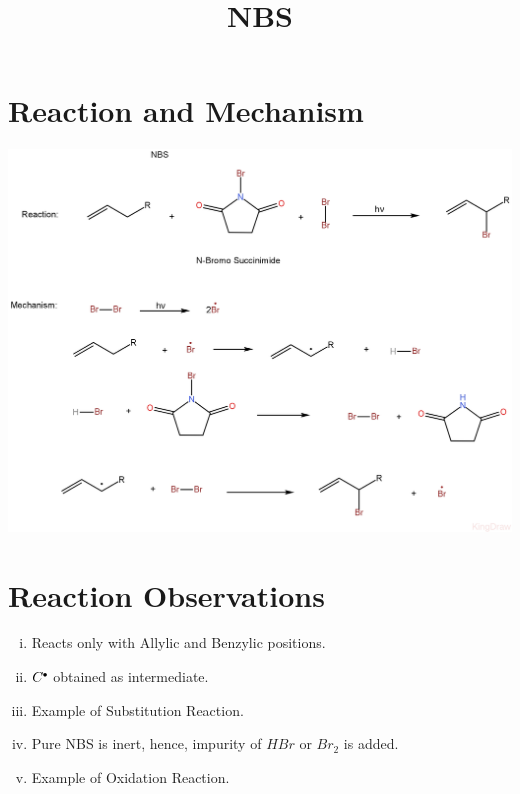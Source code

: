 \documentclass{article}
\title{NBS}
\author{}
\date{}
\newcommand*\fullcirc[1][0.3ex]{\tikz\fill (0,0) circle (#1);}
\begin{document}
\maketitle

\section{Reaction and Mechanism}
\begin{center}
    \includegraphics[scale=0.22]{NBS.JPEG}
\end{center}
\section{Reaction Observations}
\begin{enumerate}[i.]
    \item Reacts only with Allylic and Benzylic positions.
    \item $C^{\fullcirc}$ obtained as intermediate.
    \item Example of Substitution Reaction.
    \item Pure NBS is inert, hence, impurity of $HBr$ or $Br_{2}$ is added.
    \item Example of Oxidation Reaction.
\end{enumerate}
\end{document}

